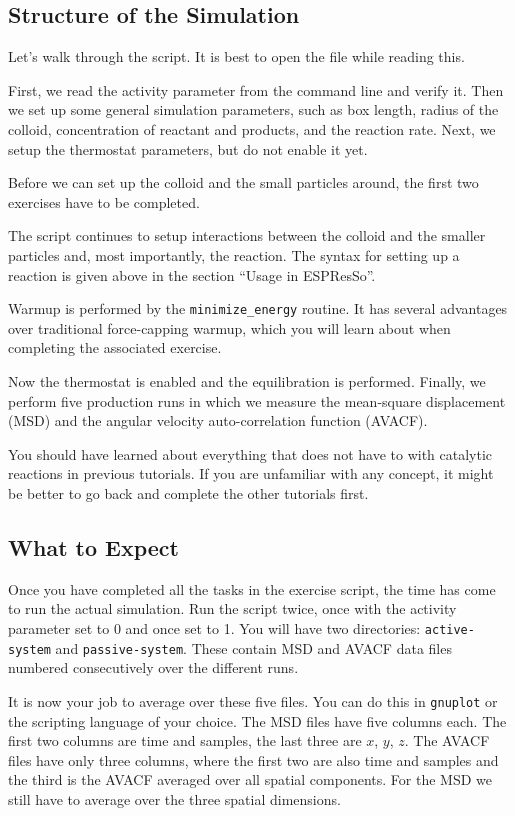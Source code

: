 \documentclass[aip,jcp,reprint,a4paper,onecolumn,nofootinbib,amsmath,amssymb]{revtex4-1}
\newcommand\code{\lstinline}
\newcommand{\es}{\mbox{\textsf{ESPResSo}}\xspace}
\newcommand\codees{\lstinline[language=espresso]}
\begin{document}
\subsection{Structure of the Simulation}

Let's walk through the script.  It is best to open the file while
reading this.

First, we read the activity parameter from the command line and verify
it.  Then we set up some general simulation parameters, such as box
length, radius of the colloid, concentration of reactant and products,
and the reaction rate.  Next, we setup the thermostat parameters, but
do not enable it yet.

Before we can set up the colloid and the small particles around, the
first two exercises have to be completed.

The script continues to setup interactions between the colloid and the
smaller particles and, most importantly, the reaction.  The syntax for
setting up a reaction is given above in the section ``Usage in \es''.

Warmup is performed by the \codees{minimize_energy} routine.  It has
several advantages over traditional force-capping warmup, which you
will learn about when completing the associated exercise.

Now the thermostat is enabled and the equilibration is performed.
Finally, we perform five production runs in which we measure the
mean-square displacement (MSD) and the angular velocity
auto-correlation function (AVACF).

You should have learned about everything that does not have to with
catalytic reactions in previous tutorials.  If you are unfamiliar with
any concept, it might be better to go back and complete the other
tutorials first.

\subsection{What to Expect}

Once you have completed all the tasks in the exercise script, the time
has come to run the actual simulation.  Run the script twice, once
with the activity parameter set to 0 and once set to 1.  You will have
two directories: \code{active-system} and \code{passive-system}.
These contain MSD and AVACF data files numbered consecutively over the
different runs.

It is now your job to average over these five files.  You can do this
in \code{gnuplot} or the scripting language of your choice.  The MSD
files have five columns each.  The first two columns are time and
samples, the last three are $x$, $y$, $z$.  The AVACF files have only
three columns, where the first two are also time and samples and the
third is the AVACF averaged over all spatial components.  For the MSD
we still have to average over the three spatial dimensions.
\end{document}
